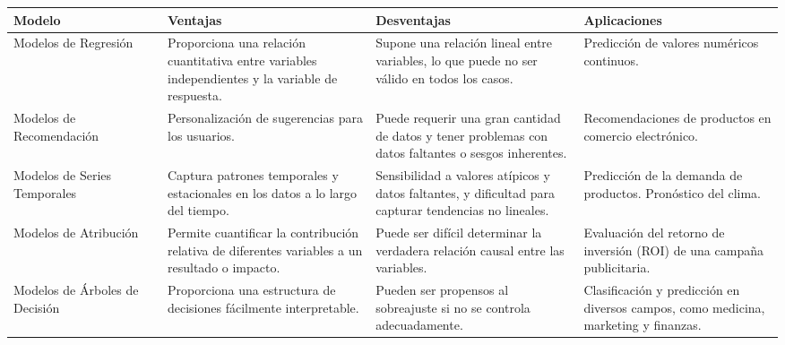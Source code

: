\begin{table}[ht]
\captionsetup{font=small} %
\small %
\begin{tabular}{|p{0.2\linewidth}|p{0.27\linewidth}|p{0.27\linewidth}|p{0.26\linewidth}|}
\hline
\textbf{Modelo} & \textbf{Ventajas} & \textbf{Desventajas} & \textbf{Aplicaciones} \\
\hline
Modelos de Regresión & 
Proporciona una relación cuantitativa entre variables independientes y la variable de respuesta. & 
Supone una relación lineal entre variables, lo que puede no ser válido en todos los casos. & 
Predicción de valores numéricos continuos. \\
\hline
Modelos de Recomendación & 
Personalización de sugerencias para los usuarios. & 
Puede requerir una gran cantidad de datos y tener problemas con datos faltantes o sesgos inherentes. & 
Recomendaciones de productos en comercio electrónico. \\
\hline
Modelos de Series Temporales & 
Captura patrones temporales y estacionales en los datos a lo largo del tiempo. & 
Sensibilidad a valores atípicos y datos faltantes, y dificultad para capturar tendencias no lineales. & 
Predicción de la demanda de productos. Pronóstico del clima. \\
\hline
Modelos de Atribución & 
Permite cuantificar la contribución relativa de diferentes variables a un resultado o impacto. & 
Puede ser difícil determinar la verdadera relación causal entre las variables. & 
Evaluación del retorno de inversión (ROI) de una campaña publicitaria. \\
\hline
Modelos de Árboles de Decisión & 
Proporciona una estructura de decisiones fácilmente interpretable. & 
Pueden ser propensos al sobreajuste si no se controla adecuadamente. & 
Clasificación y predicción en diversos campos, como medicina, marketing y finanzas. \\
\hline
\end{tabular}
\end{table}
